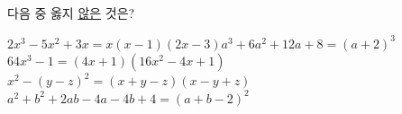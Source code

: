 다음 중 옳지 \underline{않은} 것은?
\begin{choicesv}{$2x^3-5x^2+3x=x(x-1)(2x-3)$}{$a^3+6a^2+12a+8=(a+2)^3$}{$64x^3-1=(4x+1)(16x^2-4x+1)$}{$x^2-(y-z)^2=(x+y-z)(x-y+z)$}{$a^2+b^2+2ab-4a-4b+4=(a+b-2)^2$}\end{choicesv}
